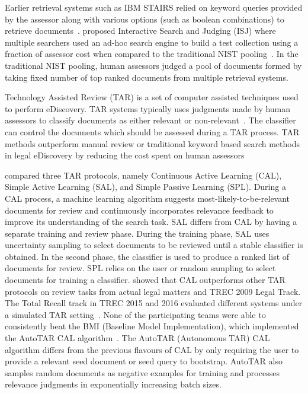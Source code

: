 Earlier retrieval systems such as IBM STAIRS relied on keyword queries provided
by the assessor along with various options (such as boolean combinations) to
retrieve documents~\cite{blair1985evaluation}. \citet{cormack1998efficient} proposed Interactive Search and Judging (ISJ)
where multiple searchers used an ad-hoc search engine to build a test
collection using a fraction of assessor cost when compared to the traditional
NIST pooling~\cite{harman1993overview}. In the traditional NIST pooling,
human assessors judged a pool of documents formed by taking fixed number of top
ranked documents from multiple retrieval systems.

Technology Assisted Review (TAR) is a set of computer assisted techniques used
to perform eDiscovery. TAR systems typically uses
judgments made by human assessors to classify documents as either relevant or
non-relevant~\cite{grossman2014grossman}. The classifier can control the
documents which should be assessed during a TAR process. TAR methods
outperform manual review or traditional keyword based search methods in legal
eDiscovery by reducing the cost spent on human
assessors~\cite{grossman2010technology,roitblat2010document}

\citet{cormack2014evaluation} compared three TAR protocols,
namely Continuous Active Learning (CAL), Simple Active Learning (SAL), and
Simple Passive Learning (SPL). During a CAL process, a machine learning
algorithm suggests most-likely-to-be-relevant documents for review and
continuously incorporates relevance feedback to improve its understanding of the
search task. SAL differs from CAL by having a separate training and review
phase. During the training phase, SAL uses uncertainty sampling to select
documents to be reviewed until a stable classifier is obtained. In the second
phase, the classifier is used to produce a ranked list of documents for review.
SPL relies on the user or random sampling to select documents for training a
classifier.  \citet{cormack2014evaluation} showed that CAL outperforms other TAR protocols on review
tasks from actual legal matters and TREC 2009 Legal Track.  The Total Recall
track in TREC 2015 and 2016 evaluated different systems under a simulated TAR
setting~\cite{grossman2016trec,roegiest2015trec}.  None of the participating
teams were able to consistently beat the BMI (Baseline Model Implementation), which
implemented the AutoTAR CAL algorithm~\cite{cormack2015autonomy}. The AutoTAR
(Autonomous TAR) CAL algorithm differs from the previous flavours of CAL by only
requiring the user to provide a relevant seed document or seed query to
bootstrap. AutoTAR also samples random documents as negative examples for
training and processes relevance judgments in exponentially
increasing batch sizes.

